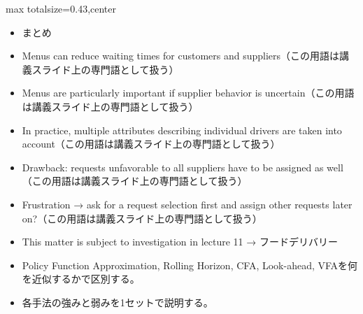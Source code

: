 \clearpage
{}
\begin{minipage}[t]{0.405\textwidth}
\begin{adjustbox}{max totalsize={\textwidth}{0.43\textheight},center}
\begin{minipage}{\textwidth}\scriptsize
{}\begin{itemize}
\item まとめ
\item Menus can reduce waiting times for customers and suppliers（この用語は講義スライド上の専門語として扱う）
\item Menus are particularly important if supplier behavior is uncertain（この用語は講義スライド上の専門語として扱う）
\item In practice, multiple attributes describing individual drivers are taken into account（この用語は講義スライド上の専門語として扱う）
\item Drawback: requests unfavorable to all suppliers have to be assigned as well（この用語は講義スライド上の専門語として扱う）
\item Frustration → ask for a request selection first and assign other requests later on?（この用語は講義スライド上の専門語として扱う）
\item This matter is subject to investigation in lecture 11 → フードデリバリー
\end{itemize}\begin{itemize}
\item Policy Function Approximation, Rolling Horizon, CFA, Look-ahead, VFAを何を近似するかで区別する。
\item 各手法の強みと弱みを1セットで説明する。
\end{itemize}
\end{minipage}
\end{adjustbox}
\end{minipage}\hfill
